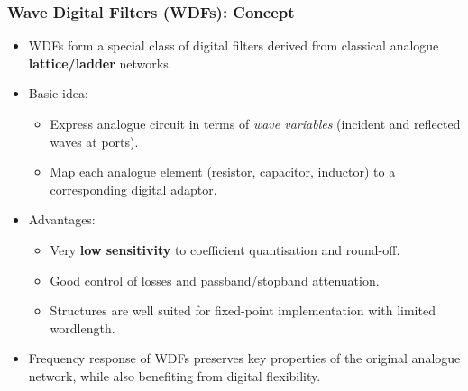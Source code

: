 
\begin{frame}
	\frametitle{Wave Digital Filters (WDFs): Concept}
	\small
	\begin{itemize}
		\item WDFs form a special class of digital filters derived from classical analogue \textbf{lattice/ladder} networks.
		\item Basic idea:
		\begin{itemize}
			\item Express analogue circuit in terms of \emph{wave variables} (incident and reflected waves at ports).
			\item Map each analogue element (resistor, capacitor, inductor) to a corresponding digital adaptor.
		\end{itemize}
		\item Advantages:
		\begin{itemize}
			\item Very \textbf{low sensitivity} to coefficient quantisation and round-off.
			\item Good control of losses and passband/stopband attenuation.
			\item Structures are well suited for fixed-point implementation with limited wordlength.
		\end{itemize}
		\item Frequency response of WDFs preserves key properties of the original analogue network, while also benefiting from digital flexibility.
	\end{itemize}
\end{frame}

